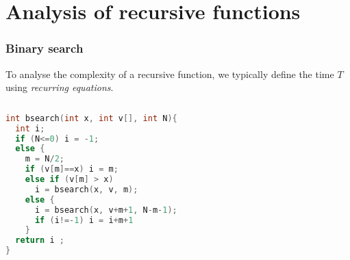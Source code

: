\documentclass[aspectratio=169]{beamer}
\begin{document}



\section{Analysis of recursive functions}

\begin{frame}[fragile]\frametitle{Binary search}

To analyse the complexity of a recursive function, we typically define the time $T$ using \emph{recurring equations}.

\begin{columns}
\begin{column}{0.48\textwidth}
\begin{lstlisting}[language=C++,emph={bsearch}]
int bsearch(int x, int v[], int N){
  int i;
  if (N<=0) i = -1;
  else {
    m = N/2;
    if (v[m]==x) i = m;
    else if (v[m] > x)
      i = bsearch(x, v, m);
    else {
      i = bsearch(x, v+m+1, N-m-1);
      if (i!=-1) i = i+m+1
    }
  return i ;
}
\end{lstlisting}
\end{column}
  \begin{column}{0.48\textwidth}
    \small
  \end{column}
\end{columns}
\end{frame}

\end{document}
